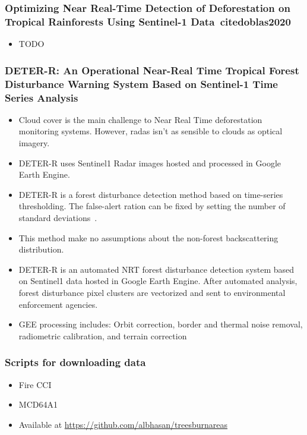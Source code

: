 \documentclass{beamer}
\begin{document}
\begin{frame}[t, allowframebreaks]
    \frametitle{Optimizing Near Real-Time Detection of Deforestation on 
    Tropical Rainforests Using Sentinel-1 Data~cite{doblas2020}}
    \begin{itemize}
        \item TODO
    \end{itemize}
\end{frame}



\begin{frame}[t, allowframebreaks]
    \frametitle{DETER-R: An Operational Near-Real Time Tropical Forest 
    Disturbance Warning System Based on Sentinel-1 Time Series Analysis~\cite{doblas2022}}
    \begin{itemize}
        \item Cloud cover is the main challenge to Near Real Time deforestation
            monitoring systems. However, radas isn't as sensible to clouds as
            optical imagery.
        \item DETER-R uses Sentinel1 Radar images hosted and processed in 
            Google Earth Engine.
        \item DETER-R is a forest disturbance detection method based on 
            time-series thresholding. The false-alert ration can be fixed by
            setting the number of standard deviations~\cite{doblas2020}.
        \item This method make no assumptions about the non-forest 
            backscattering distribution.
        \item DETER-R is an automated NRT forest disturbance detection 
            system based on Sentinel1 data hosted in Google Earth Engine. After
            automated analysis, forest disturbance pixel clusters are 
            vectorized and sent to environmental enforcement agencies.
        \item GEE processing includes: Orbit correction, border and thermal
            noise removal, radiometric calibration, and terrain correction 
    \end{itemize}
\end{frame}



\begin{frame}
    \frametitle{Scripts for downloading data}
    \begin{itemize}
        \item Fire CCI
        \item MCD64A1
        \item Available at \url{https://github.com/albhasan/treesburnareas}
    \end{itemize}
\end{frame}
\end{document}
